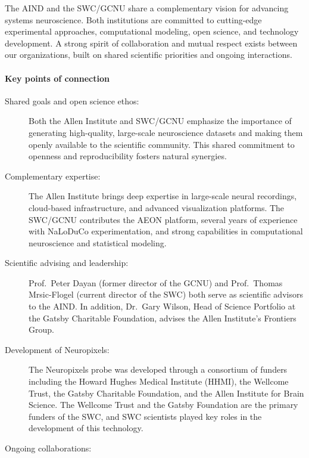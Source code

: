The AIND and the SWC/GCNU share a complementary vision for advancing systems neuroscience. Both institutions are committed to cutting-edge experimental approaches, computational modeling, open science, and technology development. A strong spirit of collaboration and mutual respect exists between our organizations, built on shared scientific priorities and ongoing interactions.

\paragraph{Key points of connection}

\begin{description}

\item[Shared goals and open science ethos:]  
Both the Allen Institute and SWC/GCNU emphasize the importance of generating high-quality, large-scale neuroscience datasets and making them openly available to the scientific community. This shared commitment to openness and reproducibility fosters natural synergies.

\item[Complementary expertise:]  
The Allen Institute brings deep expertise in large-scale neural recordings, cloud-based infrastructure, and advanced visualization platforms. The SWC/GCNU contributes the AEON platform, several years of experience with NaLoDuCo experimentation, and strong capabilities in computational neuroscience and statistical modeling.

\item[Scientific advising and leadership:]  
Prof.~Peter Dayan (former director of the GCNU) and Prof.~Thomas Mrsic-Flogel (current director of the SWC) both serve as scientific advisors to the AIND. In addition, Dr.~Gary Wilson, Head of Science Portfolio at the Gatsby Charitable Foundation, advises the Allen Institute's Frontiers Group.

\item[Development of Neuropixels:]  
The Neuropixels probe was developed through a consortium of funders including the Howard Hughes Medical Institute (HHMI), the Wellcome Trust, the Gatsby Charitable Foundation, and the Allen Institute for Brain Science. The Wellcome Trust and the Gatsby Foundation are the primary funders of the SWC, and SWC scientists played key roles in the development of this technology.

\item[Ongoing collaborations:]  


\end{description}
